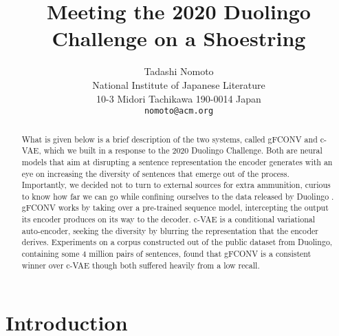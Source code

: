 \documentclass[dvipdfmx,11pt,a4paper]{article}
\title{Meeting  the 2020 Duolingo Challenge on a Shoestring}
\author{Tadashi Nomoto\\
  National Institute of Japanese Literature \\ 10-3 Midori Tachikawa  190-0014 Japan \\
  \texttt{nomoto@acm.org} \\}
\date{}
\begin{document}
\maketitle


\begin{abstract}
What is given below is a brief description of the two systems, called gFCONV and c-VAE, which we built in a response to the 2020 Duolingo Challenge.  Both are neural models that aim at disrupting a sentence representation the encoder generates with an eye on increasing the diversity of sentences that emerge out of the process.  Importantly, we decided not to turn to external sources for extra ammunition, curious  to know how far we can go while confining ourselves to the data released by Duolingo \cite{staple20}. 
gFCONV works by  taking over a pre-trained  sequence model, intercepting the output its encoder produces on its way to the decoder. c-VAE is a conditional variational auto-encoder, seeking the diversity by blurring the representation that the encoder derives. Experiments on a corpus constructed out of the public dataset from Duolingo, containing some 4 million pairs of sentences,  found that gFCONV is a consistent winner over c-VAE though both suffered heavily  from a low recall. 
\end{abstract}

\section{Introduction}
\end{document}
